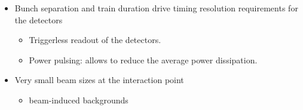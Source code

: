 \begin{frame}


\vspace{0.3cm}

\begin{itemize}
\item Bunch separation and train duration drive timing resolution requirements for the detectors
  \begin{itemize}
  \item Triggerless readout of the detectors.
  \item Power pulsing: allows to reduce the average power dissipation.
  \end{itemize}
\item Very small beam sizes at the interaction point 
  \begin{itemize}
  \item beam-induced backgrounds
  \end{itemize}
\end{itemize}

\end{frame}


